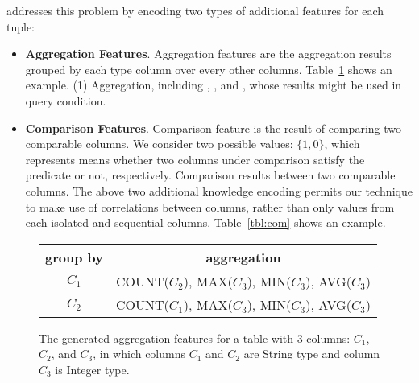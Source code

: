 \ourtool addresses this problem by encoding two types of
additional features for each tuple:

\begin{itemize}

\item {\textbf{Aggregation Features}}. Aggregation
features are the aggregation results grouped by each  type column
over every other columns. Table~\ref{tbl:agg} shows an example.
(1) Aggregation, including , ,
 and , whose results might be used in query condition.


\item {\textbf{Comparison Features}}. Comparison
feature is the result of comparing two comparable columns. We
consider two possible values:  $\{1, 0\}$,  which represents
means whether two columns under comparison satisfy the predicate or not, respectively.
Comparison results between two comparable columns.
The above two additional knowledge encoding permits our technique
to make use of correlations between columns, rather than only values
from each isolated and sequential columns.
Table~\ref{tbl:com} shows an example.


\end{itemize}

\vspace{1mm}



\begin{figure}[t]
	\begin{center}
		\begin{tabular}{|c|c|}
		\hline
		\textbf{group by}	& \textbf{aggregation} \\
		\hline
		$C_1$ 				& \textsf{COUNT}($C_2$), \textsf{MAX}($C_3$), \textsf{MIN}($C_3$), \textsf{AVG}($C_3$)\\
		$C_2$ 				& \textsf{COUNT}($C_1$), \textsf{MAX}($C_3$), \textsf{MIN}($C_3$), \textsf{AVG}($C_3$)\\
		\hline
		\end{tabular}
	\end{center}
	\caption{The generated aggregation features for
a table with 3 columns:  $C_1$, $C_2$, and $C_3$, in which
columns $C_1$ and $C_2$ are \textsf{String} type and column $C_3$ is
\textsf{Integer} type.}
	\label{tbl:agg}
\end{figure}



